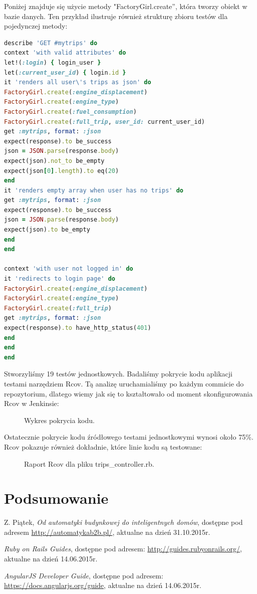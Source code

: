 \documentclass[eng,oneside]{mgr}
\begin{document}
Poniżej znajduje się użycie metody "FactoryGirl.create'', która tworzy obiekt w bazie danych. Ten przykład ilustruje również strukturę zbioru testów dla pojedynczej metody:

\begin{lstlisting}[language=Ruby, caption={Użycie FactoryGirl.}]
describe 'GET #mytrips' do
context 'with valid attributes' do
let!(:login) { login_user }
let(:current_user_id) { login.id }
it 'renders all user\'s trips as json' do
FactoryGirl.create(:engine_displacement)
FactoryGirl.create(:engine_type)
FactoryGirl.create(:fuel_consumption)
FactoryGirl.create(:full_trip, user_id: current_user_id)
get :mytrips, format: :json
expect(response).to be_success
json = JSON.parse(response.body)
expect(json).not_to be_empty
expect(json[0].length).to eq(20)
end
it 'renders empty array when user has no trips' do
get :mytrips, format: :json
expect(response).to be_success
json = JSON.parse(response.body)
expect(json).to be_empty
end
end

context 'with user not logged in' do
it 'redirects to login page' do
FactoryGirl.create(:engine_displacement)
FactoryGirl.create(:engine_type)
FactoryGirl.create(:full_trip)
get :mytrips, format: :json
expect(response).to have_http_status(401)
end
end
end
\end{lstlisting}

Stworzyliśmy 19 testów jednostkowych. Badaliśmy pokrycie kodu aplikacji testami narzędziem Rcov. Tą analizę uruchamialiśmy po każdym commicie do repozytorium, dlatego wiemy jak się to kształtowało od moment skonfigurowania Rcov w Jenkinsie:
\begin{figure}[h]
	\centering
	\caption{Wykres pokrycia kodu.}
	\label{fig:testy}
\end{figure}

Ostatecznie pokrycie kodu źródłowego testami jednostkowymi wynosi około 75\%. Rcov pokazuje również dokładnie, które linie kodu są testowane:
\begin{figure}[h]
	\centering
	\caption{Raport Rcov dla pliku trips\_controller.rb.}
	\label{fig:raport}
\end{figure}
\chapter{Podsumowanie}

\begin{thebibliography}{inteligencja}

	Z. Piątek, \emph{Od automatyki budynkowej do inteligentnych domów}, dostępne pod adresem \url{http://automatykab2b.pl/}, aktualne na dzień 31.10.2015r.
	
	\emph{Ruby on Rails Guides}, dostępne pod adresem: \url{http://guides.rubyonrails.org/},\\ aktualne na dzień 14.06.2015r.
	
	\emph{AngularJS Developer Guide}, dostępne pod adresem: \url{https://docs.angularjs.org/guide}, aktualne na dzień 14.06.2015r.
	
\end{thebibliography}
\end{document}
